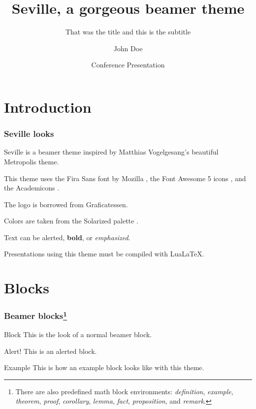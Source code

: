 \documentclass{beamer}
\title{Seville, a gorgeous beamer theme}
\subtitle{That was the title and this is the subtitle}
\author{John Doe}
\date{Conference Presentation \the\year{}}
\institute{University of \LaTeX}
\begin{document}
\begin{frame}

    \titlepage

\end{frame}

\section{Introduction}

\begin{frame}
    \frametitle{Seville looks}

    Seville is a beamer theme inspired by Matthias Vogelgesang's beautiful Metropolis theme.

    This theme uses the Fira Sans font by Mozilla \faFirefoxBrowser, the Font Awesome 5 icons \faFontAwesome, and the Academicons \aiAcademiaSquare.

    The logo is borrowed from Graficatessen.

    Colors are taken from the Solarized palette \faPalette.

    Text can be \alert{alerted}, \textbf{bold}, or \emph{emphasized}.

    Presentations using this theme must be compiled with Lua\LaTeX.

\end{frame}

\section{Blocks}

\begin{frame}
    \frametitle{Beamer blocks\footnote{There are also predefined math block environments: \emph{definition}, \emph{example}, \emph{theorem}, \emph{proof}, \emph{corollary}, \emph{lemma}, \emph{fact}, \emph{proposition}, and \emph{remark}.}}

    \begin{block}{Block}
        This is the look of a normal beamer block.
    \end{block}

    \begin{alertblock}{Alert!}
        This is an alerted block.
    \end{alertblock}

    \begin{exampleblock}{Example}
        This is how an example block looks like with this theme.
    \end{exampleblock}

\end{frame}
\end{document}
